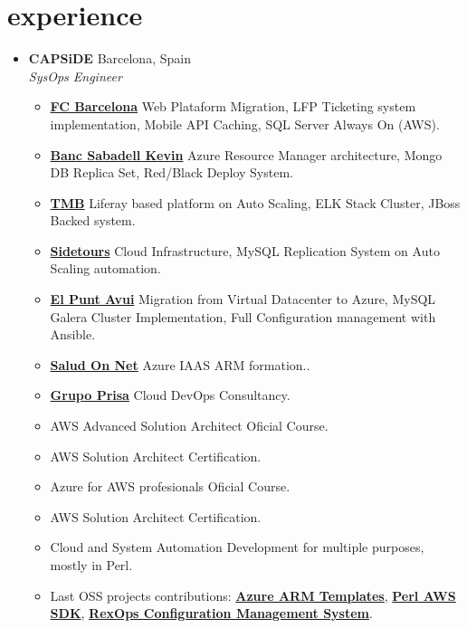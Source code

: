 \documentclass[]{friggeri-cv} %
\renewenvironment{entrylist}{%
  \begin{itemize}[leftmargin=1in]%
}{%
  \end{itemize}
}
\renewcommand{\entry}[4]{%
  \item[#1]
    \textbf{#2}%
    \hfill%
    {\footnotesize\addfontfeature{Color=lightgray} #3}\\%
    #4\vspace{\parsep}%
  }
\begin{document}
\section{experience}
\begin{entrylist}

\entry
{2014--Now}
{CAPSiDE}
{Barcelona, Spain}
{\emph{SysOps Engineer} 
\begin{itemize}[label=\textbullet]
    \item \href{http://www.fcbarcelona.com/}{\textbf{FC Barcelona}} Web Plataform Migration, LFP Ticketing system implementation, Mobile API Caching, SQL Server Always On (AWS). 
\item \href{http://kelvinretail.com/}{\textbf{Banc Sabadell Kevin}} Azure Resource Manager architecture, Mongo DB Replica Set, Red/Black Deploy System.
\item \href{http://www.tmb.cat/}{\textbf{TMB}} Liferay based platform on Auto Scaling, ELK Stack Cluster, JBoss Backed system.
\item \href{http://www.sidetours.com/}{\textbf{Sidetours}} Cloud Infrastructure, MySQL Replication System on Auto Scaling automation.
\item \href{http://www.elpuntavui.cat/}{\textbf{El Punt Avui}} Migration from Virtual Datacenter to Azure, MySQL Galera Cluster Implementation, Full Configuration management with Ansible.
\item \href{https://www.saludonnet.com/}{\textbf{Salud On Net}} Azure IAAS ARM formation..
\item \href{http://www.prisa.com/}{\textbf{Grupo Prisa}} Cloud DevOps Consultancy.
\item AWS Advanced Solution Architect Oficial Course.  
\item AWS Solution Architect Certification. 
\item Azure for AWS profesionals Oficial Course. 
\item AWS Solution Architect Certification. 
\item Cloud and System Automation Development for multiple purposes, mostly in Perl.
\item Last OSS projects contributions: \href{https://github.com/Azure/azure-quickstart-templates}{\textbf{Azure ARM Templates}}, \href{https://github.com/pplu/aws-sdk-perl}{\textbf{Perl AWS SDK}}, \href{https://github.com/RexOps/Rex}{\textbf{RexOps Configuration Management System}}.
\end{itemize}}


\end{entrylist}
\end{document}
